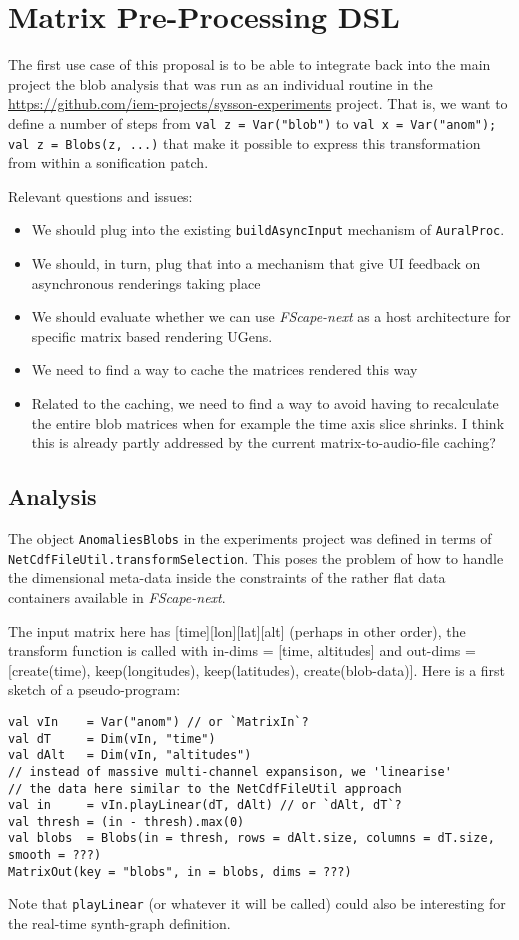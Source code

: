 \documentclass[11pt,a4paper]{article}
\newcommand{\software}[1]{\textit{#1}}
\begin{document}
\section{Matrix Pre-Processing DSL}

The first use case of this proposal is to be able to integrate back into the main project the blob analysis that was run as an individual routine in the \url{https://github.com/iem-projects/sysson-experiments} project. That is, we want to define a number of steps from \Verb!val z = Var("blob")! to \Verb!val x = Var("anom");! \linebreak\Verb!val z = Blobs(z, ...)! that make it possible to express this transformation from within a sonification patch.

Relevant questions and issues:
%
\begin{itemize}
\item We should plug into the existing \Verb!buildAsyncInput! mechanism of \Verb!AuralProc!.
\item We should, in turn, plug that into a mechanism that give UI feedback on asynchronous renderings taking place
\item We should evaluate whether we can use \software{FScape-next} as a host architecture for specific matrix based rendering UGens.
\item We need to find a way to cache the matrices rendered this way
\item Related to the caching, we need to find a way to avoid having to recalculate the entire blob matrices when for example the time axis slice shrinks. I think this is already partly addressed by the current matrix-to-audio-file caching?
\end{itemize}

\subsection*{Analysis}
The object \Verb!AnomaliesBlobs! in the experiments project was defined in terms of \linebreak\Verb!NetCdfFileUtil.transformSelection!. This poses the problem of how to handle the dimensional meta-data inside the constraints of the rather flat data containers available in \software{FScape-next}.

The input matrix here has [time][lon][lat][alt] (perhaps in other order), the transform function is called with in-dims = [time, altitudes] and out-dims = [create(time), keep(longitudes), keep(latitudes), create(blob-data)]. Here is a first sketch of a pseudo-program:
%
\begin{lstlisting}[style=scala]
val vIn    = Var("anom") // or `MatrixIn`?
val dT     = Dim(vIn, "time")
val dAlt   = Dim(vIn, "altitudes")
// instead of massive multi-channel expansison, we 'linearise'
// the data here similar to the NetCdfFileUtil approach
val in     = vIn.playLinear(dT, dAlt) // or `dAlt, dT`?
val thresh = (in - thresh).max(0)
val blobs  = Blobs(in = thresh, rows = dAlt.size, columns = dT.size, smooth = ???)
MatrixOut(key = "blobs", in = blobs, dims = ???)
\end{lstlisting}
%
Note that \Verb!playLinear! (or whatever it will be called) could also be interesting for the real-time synth-graph definition.
\end{document}
